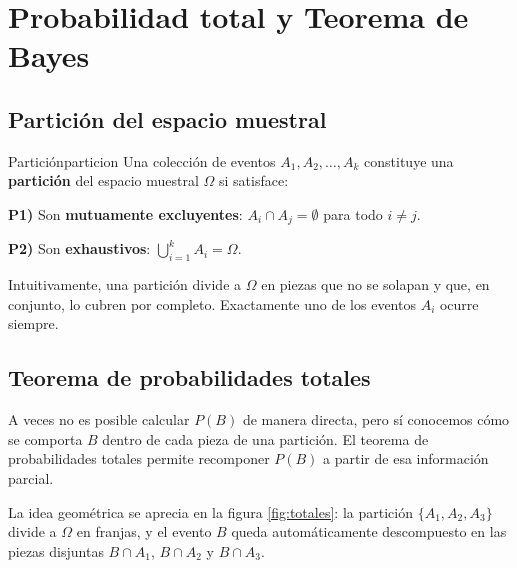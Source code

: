 \documentclass[12pt, a4paper]{book}
\numberwithin{equation}{chapter}
\begin{document}
\section{Probabilidad total y Teorema de Bayes}

\subsection{Partición del espacio muestral}

\begin{definicion}{Partición}{particion}
	Una colección de eventos $A_1, A_2, \ldots, A_k$ constituye una 
	\textbf{partición} del espacio muestral $\Omega$ si satisface:
	
	\medskip
	\noindent\textbf{P1)} Son \textbf{mutuamente excluyentes}: 
	$A_i \cap A_j = \emptyset$ para todo $i \neq j$.
	
	\medskip
	\noindent\textbf{P2)} Son \textbf{exhaustivos}: 
	$\displaystyle\bigcup_{i=1}^{k} A_i = \Omega$.
\end{definicion}

Intuitivamente, una partición divide a $\Omega$ en piezas que no se 
solapan y que, en conjunto, lo cubren por completo. Exactamente uno de 
los eventos $A_i$ ocurre siempre.

\subsection{Teorema de probabilidades totales}

A veces no es posible calcular $P(B)$ de manera directa, pero sí 
conocemos cómo se comporta $B$ dentro de cada pieza de una partición. 
El teorema de probabilidades totales permite recomponer $P(B)$ a partir 
de esa información parcial.

La idea geométrica se aprecia en la figura \ref{fig:totales}: la 
partición $\{A_1, A_2, A_3\}$ divide a $\Omega$ en franjas, y el evento 
$B$ queda automáticamente descompuesto en las piezas disjuntas 
$B \cap A_1$, $B \cap A_2$ y $B \cap A_3$.
\end{document}
